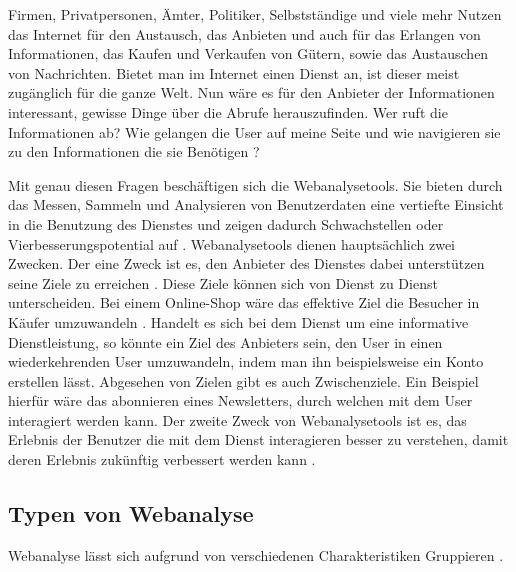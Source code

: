 Firmen, Privatpersonen, Ämter, Politiker, Selbstständige und viele mehr Nutzen das Internet für den Austausch, das Anbieten und auch für das Erlangen von Informationen, das Kaufen und Verkaufen von Gütern, sowie das Austauschen von Nachrichten. Bietet man im Internet einen Dienst an, ist dieser meist zugänglich für die ganze Welt. Nun wäre es für den Anbieter der Informationen interessant, gewisse Dinge über die Abrufe herauszufinden. Wer ruft die Informationen ab? Wie gelangen die User auf meine Seite und wie navigieren sie zu den Informationen die sie Benötigen \parencite[S. 175]{nakatani2011toolselectionmethod}?

Mit genau diesen Fragen beschäftigen sich die Webanalysetools. Sie bieten durch das Messen, Sammeln und Analysieren von Benutzerdaten eine vertiefte Einsicht in die Benutzung des Dienstes und zeigen dadurch Schwachstellen oder Vierbesserungspotential auf \parencite[S. 1]{waisberg2009webShort}. 
Webanalysetools dienen hauptsächlich zwei Zwecken. Der eine Zweck ist es, den Anbieter des Dienstes dabei unterstützen seine Ziele zu erreichen \parencite[S. 56]{AnalyticsForDummies}. Diese Ziele können sich von Dienst zu Dienst unterscheiden. Bei einem Online-Shop wäre das effektive Ziel die Besucher in Käufer umzuwandeln \parencite[S. 28]{AnalyticsForDummies}. Handelt es sich bei dem Dienst um eine informative Dienstleistung, so könnte ein Ziel des Anbieters sein, den User in einen wiederkehrenden User umzuwandeln, indem man ihn beispielsweise ein Konto erstellen lässt. Abgesehen von Zielen gibt es auch Zwischenziele. Ein Beispiel hierfür wäre das abonnieren eines Newsletters, durch welchen mit dem User interagiert werden kann. Der zweite Zweck von Webanalysetools ist es, das Erlebnis der Benutzer die mit dem Dienst interagieren besser zu verstehen, damit deren Erlebnis zukünftig verbessert werden kann \parencite[S. 1]{waisberg2009webShort}.

\subsection{Typen von Webanalyse}

Webanalyse lässt sich aufgrund von verschiedenen Charakteristiken Gruppieren \parencite[S. 172-174]{nakatani2011toolselectionmethod}.

